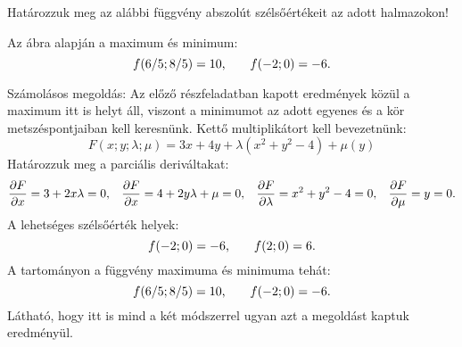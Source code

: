\begin{exercise}{%
    Határozzuk meg az alábbi függvény abszolút szélsőértékeit az adott halmazokon!
  }
{\begin{enumerate}[a)]
\begin{center}
            \end{center}
            Az ábra alapján a maximum és minimum:
            \[
              f(6/5; 8/5) = 10
              \text,\qquad
              f(-2; 0) = -6
              \text.
            \]

            Számolásos megoldás: Az előző részfeladatban kapott eredmények
            közül a maximum itt is helyt áll, viszont a minimumot az adott
            egyenes és a kör metszéspontjaiban kell keresnünk. Kettő
            multiplikátort kell bevezetnünk:
            \[
              F(x; y; \lambda; \mu) = 3x + 4y + \lambda (x^2 + y^2 - 4) + \mu (y)
            \]
            Határozzuk meg a parciális deriváltakat:
            \[
              \pdv{F}{x} = 3 + 2x \lambda = 0
              \text, \quad
              \pdv{F}{x} = 4 + 2y \lambda + \mu = 0
              \text, \quad
              \pdv{F}{\lambda} = x^2 + y^2 - 4 = 0
              \text, \quad
              \pdv{F}{\mu} = y = 0
              \text.
            \]
            A lehetséges szélsőérték helyek:
            \[
              f(-2;0) = -6
              \text,
              \qquad
              f(2;0) = 6
              \text.
            \]
            A tartományon a függvény maximuma és minimuma tehát:
            \[
              f(6/5; 8/5) = 10
              \text,\qquad
              f(-2; 0) = -6
              \text.
            \]
            Látható, hogy itt is mind a két módszerrel ugyan azt a megoldást
            kaptuk eredményül.
    \end{enumerate}
  }
\end{exercise}
